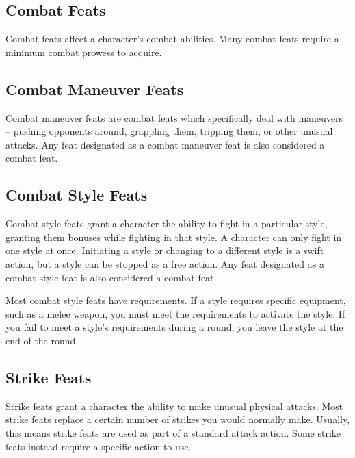 
\subsection{Combat Feats}
Combat feats affect a character's combat abilities.
Many combat feats require a minimum combat prowess to acquire.

\subsection{Combat Maneuver Feats}
Combat maneuver feats are combat feats which specifically deal with maneuvers -- pushing opponents around, grappling them, tripping them, or other unusual attacks.
Any feat designated as a combat maneuver feat is also considered a combat feat.

\subsection{Combat Style Feats}
Combat style feats grant a character the ability to fight in a particular style, granting them bonuses while fighting in that style.
A character can only fight in one style at once.
Initiating a style or changing to a different style is a swift action, but a style can be stopped as a free action.
Any feat designated as a combat style feat is also considered a combat feat.

Most combat style feats have requirements.
If a style requires specific equipment, such as a melee weapon, you must meet the requirements to activate the style.
If you fail to meet a style's requirements during a round, you leave the style at the end of the round.

\subsection{Strike Feats}\label{Strike Feats}
Strike feats grant a character the ability to make unusual physical attacks.
Most strike feats replace a certain number of strikes you would normally make.
Usually, this means strike feats are used as part of a standard attack action.
Some strike feats instead require a specific action to use.


